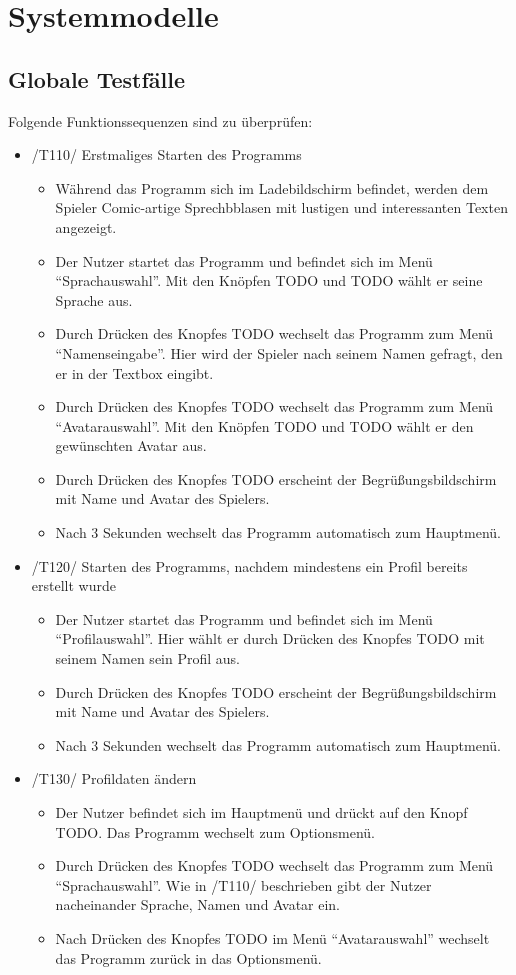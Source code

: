 \section{Systemmodelle}

\subsection{Globale Testfälle}
Folgende Funktionssequenzen sind zu überprüfen:

\begin{itemize}
\item /T110/ Erstmaliges Starten des Programms
\begin{itemize}
\item Während das Programm sich im Ladebildschirm befindet, werden dem Spieler Comic-artige Sprechbblasen mit lustigen und interessanten Texten angezeigt.
\item Der Nutzer startet das Programm und befindet sich im Menü "`Sprachauswahl"'. Mit den Knöpfen TODO und TODO wählt er seine Sprache aus.
\item Durch Drücken des Knopfes TODO wechselt das Programm zum Menü "`Namenseingabe"'. Hier wird der Spieler nach seinem Namen gefragt, den er in der Textbox eingibt.
\item Durch Drücken des Knopfes TODO wechselt das Programm zum Menü "`Avatarauswahl"'. Mit den Knöpfen TODO und TODO wählt er den gewünschten Avatar aus.
\item Durch Drücken des Knopfes TODO erscheint der Begrüßungsbildschirm mit Name und Avatar des Spielers.
\item Nach 3 Sekunden wechselt das Programm automatisch zum Hauptmenü.
\end{itemize}

\item /T120/ Starten des Programms, nachdem mindestens ein Profil bereits erstellt wurde
\begin{itemize}
\item Der Nutzer startet das Programm und befindet sich im Menü "`Profilauswahl"'. Hier wählt er durch Drücken des Knopfes TODO mit seinem Namen sein Profil aus.
\item Durch Drücken des Knopfes TODO erscheint der Begrüßungsbildschirm mit Name und Avatar des Spielers.
\item Nach 3 Sekunden wechselt das Programm automatisch zum Hauptmenü.
\end{itemize}

\item /T130/ Profildaten ändern
\begin{itemize}
\item Der Nutzer befindet sich im Hauptmenü und drückt auf den Knopf TODO. Das Programm wechselt zum Optionsmenü.
\item Durch Drücken des Knopfes TODO wechselt das Programm zum Menü "`Sprachauswahl"'. Wie in /T110/ beschrieben gibt der Nutzer nacheinander Sprache, Namen und Avatar ein.
\item Nach Drücken des Knopfes TODO im Menü "`Avatarauswahl"' wechselt das Programm zurück in das Optionsmenü.
\end{itemize}


\end{itemize}
